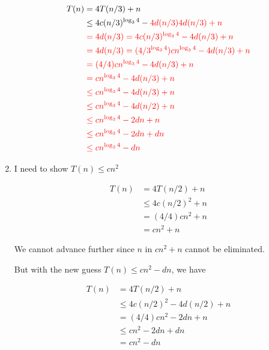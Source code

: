 \documentclass[12pt]{article}
\begin{document}
\begin{enumerate}[1.]
\begin{mdframed}
        \begin{align}
            T(n) &= 4T(n/3) + n\\
            &\leq 4c(n/3)^{\log_3 4} - \color{red}4d(n/3)4d(n/3) + n\\
            &\color{red}= 4d(n/3)= 4c(n/3)^{\log_3 4} -4 d(n/3) + n\\
            &\color{red}= 4d(n/3)= (4/3^{\log_3 4})cn^{\log_3 4} - 4d(n/3) + n\\
            &\color{red}= (4/4)cn^{\log_3 4} - 4d(n/3) + n\\
            &\color{red}= cn^{\log_3 4} - 4d(n/3) + n\\
            &\color{red}\leq cn^{\log_3 4} - 4d(n/3) + n\\
            &\color{red}\leq cn^{\log_3 4} - 4d(n/2) + n\\
            &\color{red}\leq cn^{\log_3 4} - 2dn + n\\
            &\color{red}\leq cn^{\log_3 4} - 2dn + dn\\
            &\color{red}\leq cn^{\log_3 4} - dn
        \end{align}

        \bigskip

    \end{mdframed}

    \item I need to show $T(n) \leq cn^2$

    \bigskip

    \begin{align}
        T(n) &= 4T(n/2) + n\\
        &\leq 4c(n/2)^2 + n\\
        &= (4/4)cn^2 + n\\
        &= cn^2 + n
    \end{align}

    \bigskip

    We cannot advance further since $n$ in $cn^2 + n$ cannot be eliminated.

    \bigskip

    But with the new guess $T(n) \leq cn^2 - dn$, we have

    \begin{align}
        T(n) &= 4T(n/2) + n\\
        &\leq 4c(n/2)^2 - 4d(n/2) + n\\
        &= (4/4)cn^2 - 2dn + n\\
        &\leq cn^2 - 2dn + dn\\
        &= cn^2 - dn
    \end{align}


\end{enumerate}
\end{document}
